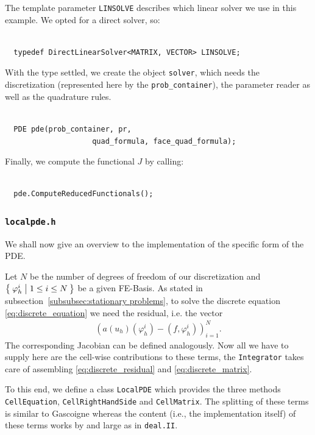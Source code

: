 \documentclass[smallextended]{svjour3}       %
\numberwithin{equation}{section}
\renewcommand{\phi}{\varphi}
\newcommand{\deal}{\texttt{deal.II}}
\begin{document}
The  template parameter \texttt{LINSOLVE} describes which linear solver we use in this example. We opted for a direct solver, so: 
\begin{lstlisting}
  
  typedef DirectLinearSolver<MATRIX, VECTOR> LINSOLVE;

\end{lstlisting}
With the type settled, we create the object \texttt{solver}, which needs the discretization (represented here by the \texttt{prob\_container}), the parameter reader as well as the quadrature rules.
\begin{lstlisting}

  PDE pde(prob_container, pr,
                    quad_formula, face_quad_formula);

\end{lstlisting}
Finally, we compute the functional $J$ by calling:
\begin{lstlisting}

  pde.ComputeReducedFunctionals();

\end{lstlisting}

\subsubsection{\texttt{localpde.h}}
We shall now give an overview to the implementation of the specific form of the PDE. 

Let $N$ be the number of degrees of freedom of our discretization and $\Set{\phi_{h}^{i}|1\leq i \leq N}$ be a given FE-Basis. As stated in subsection~\ref{subsubsec:stationary problems}, to solve the discrete equation \eqref{eq:discrete_equation} we need the residual, i.e. the vector
\begin{align}\label{eq:discrete_residual}
\left(a(u_h)(\phi_{h}^{i})-(f,\phi_{h}^{i})\right)_{i=1}^N.
\end{align}
The corresponding Jacobian can be defined analogously.
Now all we have to supply here are the cell-wise contributions to these terms, the \texttt{Integrator} takes care of assembling \eqref{eq:discrete_residual} and \eqref{eq:discrete_matrix}.

To this end, we define a class \texttt{LocalPDE} which provides the three methods
\texttt{CellEquation}, \texttt{CellRightHandSide} and \texttt{CellMatrix}. 
The splitting of these terms is similar to Gascoigne
\cite{gascoigne} whereas the content (i.e., the 
implementation itself) of these
terms works by and large as in \deal{}. 
\end{document}
